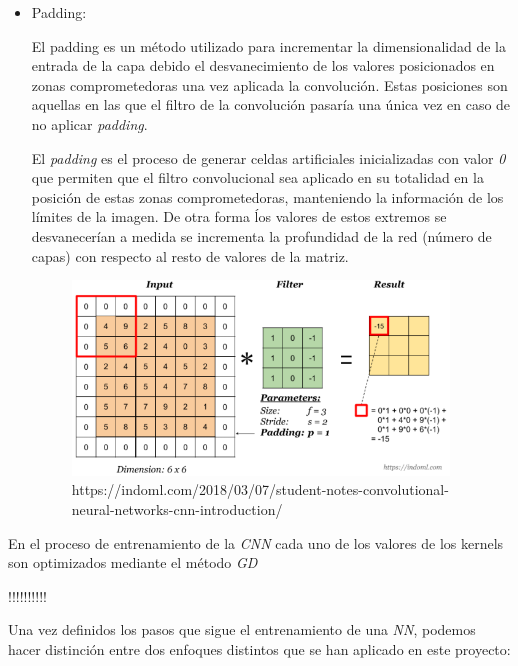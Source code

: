 \begin{itemize}
                \item Padding:

                    El padding es un método utilizado para incrementar la dimensionalidad de la entrada de la capa debido el desvanecimiento de los valores posicionados en zonas comprometedoras una vez aplicada la convolución. Estas posiciones son aquellas en las que el filtro de la convolución pasaría una única vez en caso de no aplicar \textit{padding}.

                    El \textit{padding} es el proceso de generar celdas artificiales inicializadas con valor \textit{0} que permiten que el filtro convolucional sea aplicado en su totalidad en la posición de estas zonas comprometedoras, manteniendo la información de los límites de la imagen. De otra forma ĺos valores de estos extremos se desvanecerían a medida se incrementa la profundidad de la red (número de capas) con respecto al resto de valores de la matriz.

                    \begin{figure}[h]
                        \centering
                        \includegraphics[width=10cm]{archivos/CNN/padding}
                        \caption{https://indoml.com/2018/03/07/student-notes-convolutional-neural-networks-cnn-introduction/}
                        \label{PaddingImage}
                     \end{figure}



                        
            \end{itemize}

            En el proceso de entrenamiento de la \textit{CNN} cada uno de los valores de los kernels son optimizados mediante el método \textit{GD}

            !!!!!\cite{KL-Divergence}!!!!!

            Una vez definidos los pasos que sigue el entrenamiento de una \textit{NN}, podemos hacer distinción entre dos enfoques distintos que se han aplicado en este proyecto:



